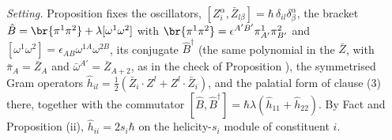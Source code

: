 \emph{Setting.} Proposition  fixes the oscillators, $[Z^{\alpha}_{i}, \bar{Z}_{l\beta}] = \hbar\,\delta_{il}\delta^{\alpha}_{\beta}$, the bracket $\hat{B} = \br{\pi^{1}\pi^{2}} + \lambda[\omega^{1}\omega^{2}]$ with $\br{\pi^{1}\pi^{2}} = \epsilon^{A'B'}\pi^{1}_{A'}\pi^{2}_{B'}$ and $[\omega^{1}\omega^{2}] = \epsilon_{AB}\omega^{1A}\omega^{2B}$, its conjugate $\hat{B}^{\dagger}$ (the same polynomial in the $\bar{Z}$, with $\bar{\pi}_{A} = \bar{Z}_{A}$ and $\bar{\omega}^{A'} = \bar{Z}_{A+2}$, as in the check of Proposition ), the symmetrised Gram operators $\hat{h}_{il} = \tfrac12(\bar{Z}_{i}\cdot Z^{l} + Z^{l}\cdot\bar{Z}_{i})$, and the palatial form of clause (3) there, together with the commutator $[\hat{B}, \hat{B}^{\dagger}] = \hbar\lambda(\hat{h}_{11} + \hat{h}_{22})$. By Fact  and Proposition (ii), $\hat{h}_{ii} = 2s_{i}\hbar$ on the helicity-$s_{i}$ module of constituent $i$.

